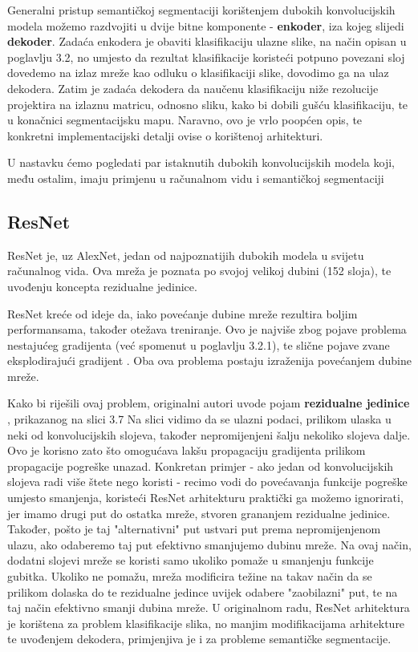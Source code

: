 Generalni pristup semantičkoj segmentaciji korištenjem dubokih konvolucijskih modela možemo razdvojiti u dvije bitne komponente - \textbf{enkoder}, iza kojeg slijedi \textbf{dekoder}. Zadaća enkodera je obaviti klasifikaciju ulazne slike, na način opisan u poglavlju 3.2, no umjesto da rezultat klasifikacije koristeći potpuno povezani sloj dovedemo na izlaz mreže kao odluku o klasifikaciji slike, dovodimo ga na ulaz dekodera. Zatim je zadaća dekodera da naučenu klasifikaciju niže rezolucije projektira na izlaznu matricu, odnosno sliku, kako bi dobili gušću klasifikaciju, te u konačnici segmentacijsku mapu. Naravno, ovo je vrlo poopćen opis, te konkretni implementacijski detalji ovise o korištenoj arhitekturi.

U nastavku ćemo pogledati par istaknutih dubokih konvolucijskih modela koji, među ostalim, imaju primjenu u računalnom vidu i semantičkoj segmentaciji


\subsection{ResNet}
ResNet je, uz AlexNet, jedan od najpoznatijih dubokih modela u svijetu računalnog vida. Ova mreža je poznata po svojoj velikoj dubini (152 sloja), te uvođenju koncepta rezidualne jedinice.

ResNet kreće od ideje da, iako povećanje dubine mreže rezultira boljim performansama, također otežava treniranje. Ovo je najviše zbog pojave problema nestajućeg gradijenta (već spomenut u poglavlju 3.2.1), te slične pojave zvane eksplodirajući gradijent . Oba ova problema postaju izraženija povećanjem dubine mreže.

Kako bi riješili ovaj problem, originalni autori uvode pojam \textbf{rezidualne jedinice} , prikazanog na slici 3.7 Na slici vidimo da se ulazni podaci, prilikom ulaska u neki od konvolucijskih slojeva, također nepromijenjeni šalju nekoliko slojeva dalje. Ovo je korisno zato što omogućava lakšu propagaciju gradijenta prilikom propagacije pogreške unazad. Konkretan primjer - ako jedan od konvolucijskih slojeva radi više štete nego koristi - recimo vodi do povećavanja funkcije pogreške umjesto smanjenja, koristeći ResNet arhitekturu praktički ga možemo ignorirati, jer imamo drugi put do ostatka mreže, stvoren grananjem rezidualne jedinice. Također, pošto je taj "alternativni" put ustvari put prema nepromijenjenom ulazu, ako odaberemo taj put efektivno smanjujemo dubinu mreže. Na ovaj način, dodatni slojevi mreže se koristi samo ukoliko pomaže u smanjenju funkcije gubitka. Ukoliko ne pomažu, mreža modificira težine na takav način da se prilikom dolaska do te rezidualne jedince uvijek odabere "zaobilazni" put, te na taj način efektivno smanji dubina mreže. U originalnom radu, \citep{resnetOriginal} ResNet arhitektura je korištena za problem klasifikacije slika, no manjim modifikacijama arhitekture te uvođenjem dekodera, primjenjiva je i za probleme semantičke segmentacije.

